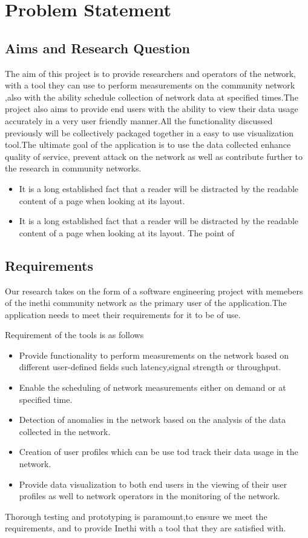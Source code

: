 \section{Problem Statement}
\subsection{Aims and Research Question}
The aim of this project is to provide researchers and operators of the network, with a tool they can use to perform measurements on the community network ,also with the ability schedule collection of network data at specified times.The project also aims to provide end users with the ability to view their data usage accurately in a very user friendly manner.All the functionality discussed previously will be collectively packaged together in a easy to use visualization tool.The ultimate goal of the application is to use the data collected enhance quality of service, prevent attack on the network as well as contribute further to the research in community networks.

\begin{itemize}
	\item It is a long established fact that a reader will be distracted by the readable content of a page when looking at its layout. 
	\item It is a long established fact that a reader will be distracted by the readable content of a page when looking at its layout. The point of 
\end{itemize}

\subsection{Requirements}
Our research takes on the form of a software engineering project with memebers of the inethi community network as the primary user of the application.The application needs to meet their requirements for it to be of use.
 
Requirement of the tools is as follows 
\begin{itemize}
	\item Provide functionality to perform measurements on the network based on different user-defined fields such latency,signal strength or throughput.
	
	\item Enable the scheduling of network measurements either on demand or at specified time.  
	
	\item Detection of anomalies in the network based on the analysis of the data collected in the network.
	
	\item Creation of user profiles which can be use tod track their data usage in the network. 
	
	\item Provide data visualization to both end users in the viewing of their user profiles as well to network operators in the monitoring of the network.
\end{itemize}
Thorough testing and prototyping is paramount,to ensure we meet the requirements, and to provide Inethi with a tool that they are satisfied with.
